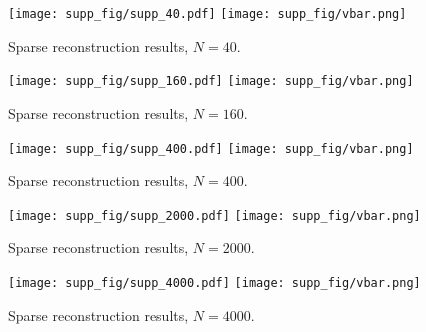 \begin{figure*}
  \centering

  {\texttt{[image: supp\_fig/supp\_40.pdf]}}
  {\texttt{[image: supp\_fig/vbar.png]}}
   \caption{Sparse reconstruction results, $N = 40$.}
   \label{fig:40}
\end{figure*}

\begin{figure*}
  \centering

  {\texttt{[image: supp\_fig/supp\_160.pdf]}}
  {\texttt{[image: supp\_fig/vbar.png]}}
   \caption{Sparse reconstruction results, $N = 160$.}
   \label{fig:160}
\end{figure*}

\begin{figure*}
  \centering

  {\texttt{[image: supp\_fig/supp\_400.pdf]}}
  {\texttt{[image: supp\_fig/vbar.png]}}
   \caption{Sparse reconstruction results, $N = 400$.}
   \label{fig:400}
\end{figure*}

\begin{figure*}
  \centering

  {\texttt{[image: supp\_fig/supp\_2000.pdf]}}
  {\texttt{[image: supp\_fig/vbar.png]}}
   \caption{Sparse reconstruction results, $N = 2000$.}
   \label{fig:2000}
\end{figure*}

\begin{figure*}
  \centering

  {\texttt{[image: supp\_fig/supp\_4000.pdf]}}
  {\texttt{[image: supp\_fig/vbar.png]}}
   \caption{Sparse reconstruction results, $N = 4000$.}
   \label{fig:4000}
\end{figure*}


